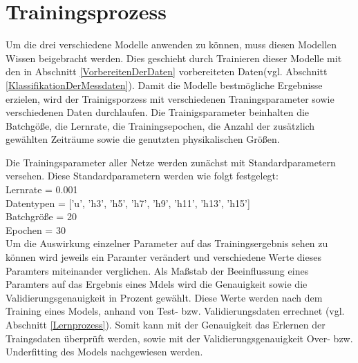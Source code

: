 \section{Trainingsprozess}
    Um die drei verschiedene Modelle anwenden zu können, muss diesen Modellen Wissen beigebracht werden.
    Dies geschieht durch Trainieren dieser Modelle mit den in Abschnitt \ref{VorbereitenDerDaten} vorbereiteten Daten(vgl. Abschnitt \ref{KlassifikationDerMessdaten}).
    Damit die Modelle bestmögliche Ergebnisse erzielen, wird der Trainigsporzess mit verschiedenen Traningsparameter sowie verschiedenen Daten durchlaufen.
    Die Trainigsparameter beinhalten die Batchgöße, die Lernrate, die Trainingsepochen, die Anzahl der zusätzlich gewählten Zeiträume sowie die genutzten physikalischen Größen.
    \newline

    \noindent
    Die Trainingsparameter aller Netze werden zunächst mit Standardparametern versehen.
    \newline
    \noindent
    Diese Standardparametern werden wie folgt festgelegt:\\
    \noindent
    Lernrate = 0.001\\
    \noindent
    Datentypen = ['u', 'h3', 'h5', 'h7', 'h9', 'h11', 'h13', 'h15']\\
    \noindent
    Batchgröße = 20\\
    \noindent
    Epochen = 30\\

    \noindent
    Um die Auswirkung einzelner Parameter auf das Trainingsergebnis sehen zu können wird jeweils ein Paramter verändert und verschiedene Werte dieses Paramters miteinander verglichen.
    \newline
    \noindent
    Als Maßstab der Beeinflussung eines Paramters auf das Ergebnis eines Mdels wird die Genauigkeit sowie die Validierungsgenauigkeit in Prozent gewählt.
    Diese Werte werden nach dem Training eines Models, anhand von Test- bzw. Validierungsdaten errechnet (vgl. Abschnitt \ref{Lernprozess}). 
    Somit kann mit der Genauigkeit das Erlernen der Traingsdaten überprüft werden, sowie mit der Validierungsgenauigkeit Over- bzw. Underfitting des Models nachgewiesen werden.
    \newline

